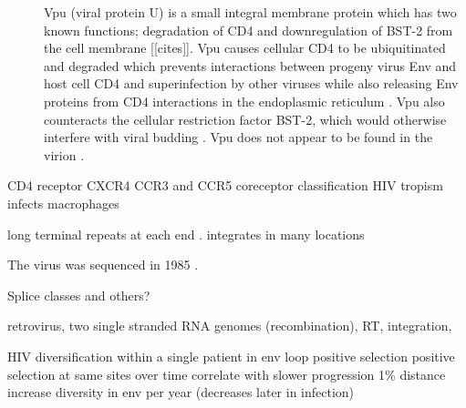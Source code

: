 \documentclass[../sherrill-Mix_thesis.tex]{subfiles}
\begin{document}
\begin{description}
	\item[\vpu{}]
		Vpu (viral protein U) \citep{Cohen1988,Strebel1988} is a small integral membrane protein which has two known functions; degradation of CD4 and downregulation of BST-2 from the cell membrane [[cites]]. Vpu causes cellular CD4 to be ubiquitinated and degraded \citep{Willey1992,Bour1995} which prevents interactions between progeny virus Env and host cell CD4 \citep{Marshall1992,Lama1999,Ross1999,Cortes2002} and superinfection by other viruses \citep{Benson1993}  while also releasing Env proteins from CD4 interactions in the endoplasmic reticulum \citep{Crise1990,Bour1991}. Vpu also counteracts the cellular restriction factor BST-2, which would otherwise interfere with viral budding \citep{Neil2008}. Vpu does not appear to be found in the virion \citep{Strebel1989}.
\end{description}



CD4 receptor \citep{Lifson1986,Lifson1986a,Maddon1986} CXCR4 \citep{Feng1996} CCR3 and CCR5 coreceptor \citep{Choe1996,He1997} classification \citep{Berger1998}
HIV tropism infects macrophages \citep{Koenig1986}


long terminal repeats at each end \citep{Hughes1978}. integrates in many locations \citep{Hughes1978}


The virus was sequenced in 1985 \citep{Wain-Hobson1985,Muesing1985,Ratner1985,Sanchez-Pescador1985}.

Splice classes \citep{Muesing1985} and others?

retrovirus, two single stranded RNA genomes (recombination), RT, integration,

HIV diversification within a single patient in env loop \citep{Holmes1992} positive selection \citep{Bonhoeffer1995,Ross2002} positive selection at same sites over time correlate with slower progression \citep{Wolinsky1996,Ross2002} 1\% distance increase diversity in env per year (decreases later in infection) \citep{Shankarappa1999}
\end{document}
